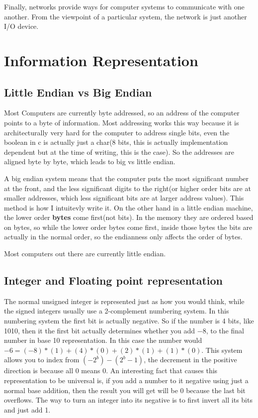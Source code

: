 \documentclass{article}
\begin{document}
Finally, networks provide ways for computer systems to communicate with
one another. From the viewpoint of a particular system, the network is just another
I/O device.

\section{Information Representation}

\subsection{Little Endian vs Big Endian}

Most Computers are currently byte addressed, so an address of the computer points to a byte of information.
Most addressing works this way because it is architecturally very hard for the computer to address single bits, 
even the boolean in c is actually just a char(8 bits, this is actually implementation dependent but at the time of writing, 
this is the case). So the addresses are aligned byte by byte, which leads to big vs little endian.

A big endian system means that the computer puts the most significant number at the front, and the less significant
digits to the right(or higher order bits are at smaller addresses, which less significant bits are at larger address values). This method is how I intuitevly write it.
On the other hand in a little endian machine, the lower order \textbf{bytes} come first(not bits). In the memory they are ordered based on bytes, so while 
the lower order bytes come first, inside those bytes the bits are actually in the normal order, so the endianness only affects the order of bytes.

Most computers out there are currently little endian.

\subsection{Integer and Floating point representation}

The normal unsigned integer is represented just as how you would think, while the signed integers usually use a 2-complement numbering system.
In this numbering system the first bit is actually negative. So if the number is 4 bits, like 1010, then it the first bit actually determines whether you 
add $-8$, to the final number in base 10 representation. In this case the number would $ -6 = (-8)*(1)+(4)*(0)+(2)*(1)+(1)*(0)$. This system allows you to index 
from $(-2^{b}) - (2^{b}-1)$, the decrement in the positive direction is because all 0 means 0. An interesting fact that causes this representation to be universal is, if you add 
a number to it negative using just a normal base addition, then the result you will get will be $0$ because the last bit overflows. The way to turn an integer into its negative is 
to first invert all its bits and just add 1.
\end{document}
